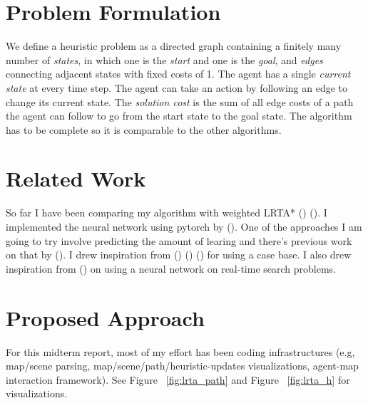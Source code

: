 \documentclass[letterpaper]{article}
\newcommand{\citea}[1]{\citeauthor{#1} (\citeyear{#1})}
\numberwithin{equation}{section}
\numberwithin{theorem}{section}
\numberwithin{lemma}{section}
\numberwithin{df}{section}
\begin{document}
    \section{Problem Formulation}\label{sec:problem-formulation}


    We define a heuristic problem as a directed graph containing a finitely many number of \textit{states}, in which one is the \textit{start} and one is the \textit{goal}, and \textit{edges} connecting adjacent states with fixed costs of 1.
    The agent has a single \textit{current state} at every time step.
    The agent can take an action by following an edge to change its current state.
    The \textit{solution cost} is the sum of all edge costs of a path the agent can follow to go from the start state to the goal state.
    The algorithm has to be complete so it is comparable to the other algorithms.


    \section{Related Work}\label{sec:related-work}

    So far I have been comparing my algorithm with weighted LRTA* \citea{lrta} \citea{weighted_lrta}.
    I implemented the neural network using pytorch by \citea{pytorch}.
    One of the approaches I am going to try involve predicting the amount of learing and there's previous work on that by \citea{learning_cost}.
    I drew inspiration from \citea{dlrta} \citea{knnlrta} \citea{hcdps} for using a case base.
    I also drew inspiration from \citea{rtnn} on using a neural network on real-time search problems.


    \section{Proposed Approach}\label{sec:proposed-approach}

    For this midterm report, most of my effort has been coding infrastructures (e.g, map/scene parsing, map/scene/path/heuristic-updates visualizations, agent-map interaction framework).
    See Figure ~\ref{fig:lrta_path} and Figure ~\ref{fig:lrta_h} for visualizations.
\end{document}
